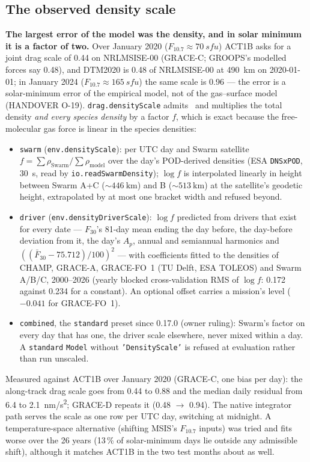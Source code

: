 \subsection{The observed density scale}\label{sec:densityscale}
\textbf{The largest error of the model was the density, and in solar minimum it is a factor of two.} Over January 2020 ($F_{10.7}\approx\SI{70}{sfu}$) ACT1B asks for a joint drag scale of 0.44 on NRLMSISE-00 (GRACE-C; GROOPS's modelled forces say 0.48), and DTM2020 is 0.48 of NRLMSISE-00 at \SI{490}{\kilo\metre} on 2020-01-01; in January 2024 ($F_{10.7}\approx\SI{165}{sfu}$) the same scale is 0.96 --- the error is a solar-minimum error of the empirical model, not of the gas--surface model (HANDOVER O-19). \texttt{drag.densityScale} admits \ngfoptdragdensityScale\ and multiplies the total density \emph{and every species density} by a factor $f$, which is exact because the free-molecular gas force is linear in the species densities:
\begin{itemize}[itemsep=0pt]
\item \texttt{swarm} (\texttt{env.densityScale}): per UTC day and Swarm satellite $f=\sum\rho_{\mathrm{Swarm}}/\sum\rho_{\mathrm{model}}$ over the day's POD-derived densities (ESA \texttt{DNSxPOD}, \SI{30}{\second}, read by \texttt{io.readSwarmDensity}); $\log f$ is interpolated linearly in height between Swarm A+C ($\sim\SI{446}{\kilo\metre}$) and B ($\sim\SI{513}{\kilo\metre}$) at the satellite's geodetic height, extrapolated by at most one bracket width and refused beyond.
\item \texttt{driver} (\texttt{env.densityDriverScale}): $\log f$ predicted from drivers that exist for every date --- $F_{30}$'s 81-day mean ending the day before, the day-before deviation from it, the day's $A_p$, annual and semiannual harmonics and $((\bar F_{30}-75.712)/100)^2$ --- with coefficients fitted to the densities of CHAMP, GRACE-A, GRACE-FO~1 (TU Delft, ESA TOLEOS) and Swarm A/B/C, 2000--2026 (yearly blocked cross-validation RMS of $\log f$: 0.172 against 0.234 for a constant). An optional offset carries a mission's level ($-0.041$ for GRACE-FO~1).
\item \texttt{combined}, the \texttt{standard} preset since 0.17.0 (owner ruling): Swarm's factor on every day that has one, the driver scale elsewhere, never mixed within a day. A \texttt{standard} \texttt{Model} without \texttt{'DensityScale'} is refused at evaluation rather than run unscaled.
\end{itemize}
Measured against ACT1B over January 2020 (GRACE-C, one bias per day): the along-track drag scale goes from 0.44 to 0.88 and the median daily residual from \SI{6.4}{} to \SI{2.1}{nm/s^2}; GRACE-D repeats it (0.48 $\to$ 0.94). The native integrator path serves the scale as one row per UTC day, switching at midnight. A temperature-space alternative (shifting MSIS's $F_{10.7}$ inputs) was tried and fits worse over the 26 years (13\,\% of solar-minimum days lie outside any admissible shift), although it matches ACT1B in the two test months about as well.

